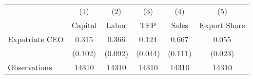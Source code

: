 \begin{tabular}{l*{5}{c}}
\hline\hline
                    &\multicolumn{1}{c}{(1)}&\multicolumn{1}{c}{(2)}&\multicolumn{1}{c}{(3)}&\multicolumn{1}{c}{(4)}&\multicolumn{1}{c}{(5)}\\
                    &\multicolumn{1}{c}{Capital}&\multicolumn{1}{c}{Labor}&\multicolumn{1}{c}{TFP}&\multicolumn{1}{c}{Sales}&\multicolumn{1}{c}{Export Share}\\
\hline
Expatriate CEO      &       0.315&       0.366&       0.124&       0.667&       0.055\\
                    &     (0.102)&     (0.092)&     (0.044)&     (0.111)&     (0.023)\\
\hline
Observations        &       14310&       14310&       14310&       14310&       14310\\
\hline\hline
\end{tabular}
